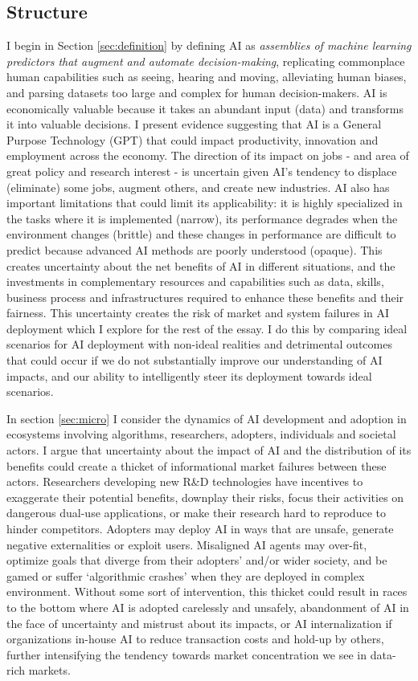 \documentclass[11pt]{article}
\begin{document}
\subsection{Structure}
\label{subsec:structure}

 I begin in Section \ref{sec:definition} by defining AI as \textit{assemblies of machine learning predictors that augment and automate decision-making}, replicating commonplace human capabilities such as seeing, hearing and moving, alleviating human biases, and parsing datasets too large and complex for human decision-makers. AI is economically valuable because it takes an abundant input (data) and transforms it into valuable decisions. I present evidence suggesting that AI is a General Purpose Technology (GPT) that could impact productivity, innovation and employment across the economy. The direction of its impact on jobs - and area of great policy and research interest - is uncertain given AI's tendency to displace (eliminate) some jobs, augment others, and create new industries. AI also has important limitations that could limit its applicability: it is highly specialized in the tasks where it is implemented (narrow), its performance degrades when the environment changes (brittle) and these changes in performance are difficult to predict because advanced AI methods are poorly understood (opaque). This creates uncertainty about the net benefits of AI in different situations, and the investments in complementary resources and capabilities such as data, skills, business process and infrastructures  required to enhance these benefits and their fairness. This uncertainty creates the risk of market and system failures in AI deployment which I explore for the rest of the essay. I do this by comparing ideal scenarios for AI deployment with non-ideal realities and detrimental outcomes that could occur if we do not substantially improve our understanding of AI impacts, and our ability to intelligently steer its deployment towards ideal scenarios.
 
 In section \ref{sec:micro} I consider the dynamics of AI development and adoption in ecosystems involving algorithms, researchers, adopters, individuals and societal actors. I argue that uncertainty about the impact of AI and the distribution of its benefits could create a thicket of informational market failures between these actors. Researchers developing new R\&D technologies have incentives to exaggerate their potential benefits, downplay their risks, focus their activities on dangerous dual-use applications, or make their research hard to reproduce to hinder competitors. Adopters may deploy AI in ways that are unsafe, generate negative externalities or exploit users. Misaligned AI agents may over-fit, optimize goals that diverge from their adopters' and/or wider society, and be gamed or suffer `algorithmic crashes' when they are deployed in complex environment. Without some sort of intervention, this thicket could result in races to the bottom where AI is adopted carelessly and unsafely, abandonment of AI in the face of uncertainty and mistrust about its impacts, or AI internalization if organizations in-house AI to reduce transaction costs and hold-up by others, further intensifying the tendency towards market concentration we see in data-rich markets. 
 
\end{document}
